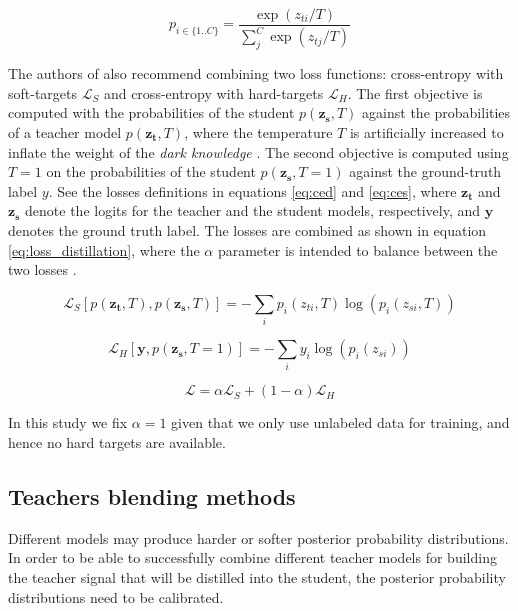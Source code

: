 \documentclass{elsarticle}
\begin{document}
	\begin{equation}
	p_{i \in \{1 .. C\}} = \frac{\exp(z_{ti}/T)}{\sum_j^C \exp(z_{tj}/T)}
	\label{eq:softmax}
	\end{equation}

	The authors of \citep{hinton2015} also recommend combining two loss functions: cross-entropy with soft-targets $\mathcal{L}_S$ and cross-entropy with hard-targets  $\mathcal{L}_H$. The first objective is computed with the probabilities of the student $p( \mathbf{z_s}, T)$ against the probabilities of a teacher model $p( \mathbf{z_t}, T)$, where the temperature $T$ is artificially increased to inflate the weight of the \textit{dark knowledge} \citep{hinton2015}. The second objective is computed using  $T=1$ on the probabilities of the student $p( \mathbf{z_s}, T=1)$ against the ground-truth label $y$. See the losses definitions in equations \ref{eq:ced} and \ref{eq:ces}, where $\mathbf{z_t}$ and $\mathbf{z_s}$ denote the logits for the teacher and the student models, respectively, and $\mathbf{y}$ denotes the ground truth label. The losses are combined as shown in equation \ref{eq:loss_distillation}, where the $\alpha$ parameter is intended to balance between the two losses \citep{gou2020}.

	\begin{equation}
	\mathcal{L}_S\left[p( \mathbf{z_t}, T), p(\mathbf{z_s}, T) \right] = -\sum_i p_i(z_{ti}, T) \log \left(p_i(z_{si}, T)\right)
	\label{eq:ced}
	\end{equation}

	\begin{equation}
	\mathcal{L}_{H}\left[\mathbf{y}, p(\mathbf{z_s}, T=1) \right] = -\sum_i y_i \log \left(p_i(z_{si})\right)
	\label{eq:ces}
	\end{equation}

	\begin{equation}
	\mathcal{L} = \alpha \mathcal{L}_S + (1-\alpha) \mathcal{L}_{H}
	\label{eq:loss_distillation}
	\end{equation}

	In this study we fix $\alpha=1$ given that we only use unlabeled data for training, and hence no hard targets are available.

	\subsection{Teachers blending methods} \label{sec:teachers_comb}
	 Different models may produce harder or softer posterior probability distributions. In order to be able to successfully combine different teacher models for building the teacher signal that will be distilled into the student, the posterior probability distributions need to be calibrated.
\end{document}
